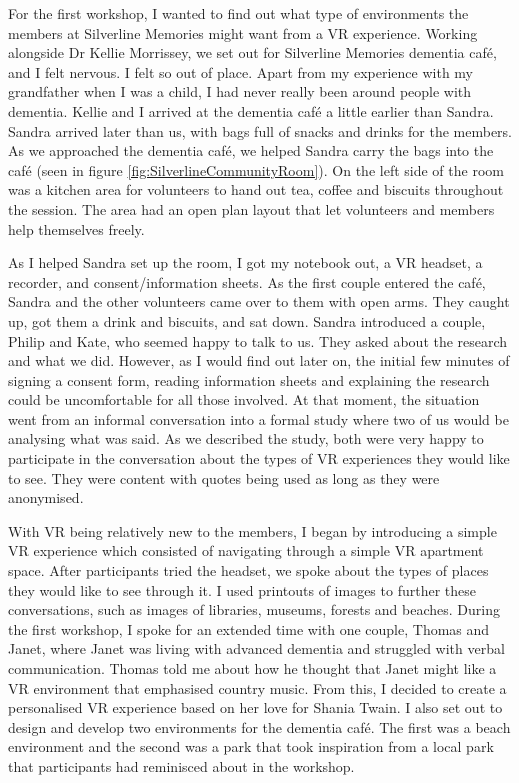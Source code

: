 For the first workshop, I wanted to find out what type of environments the members at Silverline Memories might want from a VR experience. Working alongside Dr Kellie Morrissey, we set out for Silverline Memories dementia café, and I felt nervous. I felt so out of place. Apart from my experience with my grandfather when I was a child, I had never really been around people with dementia. Kellie and I arrived at the dementia café a little earlier than Sandra. Sandra arrived later than us, with bags full of snacks and drinks for the members. As we approached the dementia café, we helped Sandra carry the bags into the  café (seen in figure \ref{fig:SilverlineCommunityRoom}). On the left side of the room was a kitchen area for volunteers to hand out tea, coffee and biscuits throughout the session. The area had an open plan layout that let volunteers and members help themselves freely. 

As I helped Sandra set up the room, I got my notebook out, a VR headset, a recorder, and consent/information sheets. As the first couple entered the café, Sandra and the other volunteers came over to them with open arms. They caught up, got them a drink and biscuits, and sat down. Sandra introduced a couple, Philip and Kate, who seemed happy to talk to us. They asked about the research and what we did. However, as I would find out later on, the initial few minutes of signing a consent form, reading information sheets and explaining the research could be uncomfortable for all those involved. At that moment, the situation went from an informal conversation into a formal study where two of us would be analysing what was said. As we described the study, both were very happy to participate in the conversation about the types of VR experiences they would like to see. They were content with quotes being used as long as they were anonymised.

With VR being relatively new to the members, I began by introducing a simple VR experience which consisted of navigating through a simple VR apartment space. After participants tried the headset, we spoke about the types of places they would like to see through it. I used printouts of images to further these conversations, such as images of libraries, museums, forests and beaches. During the first workshop, I spoke for an extended time with one couple, Thomas and Janet, where Janet was living with advanced dementia and struggled with verbal communication. Thomas told me about how he thought that Janet might like a VR environment that emphasised country music. From this, I decided to create a personalised VR experience based on her love for Shania Twain. I also set out to design and develop two environments for the dementia café. The first was a beach environment and the second was a park that took inspiration from a local park that participants had reminisced about in the workshop.

